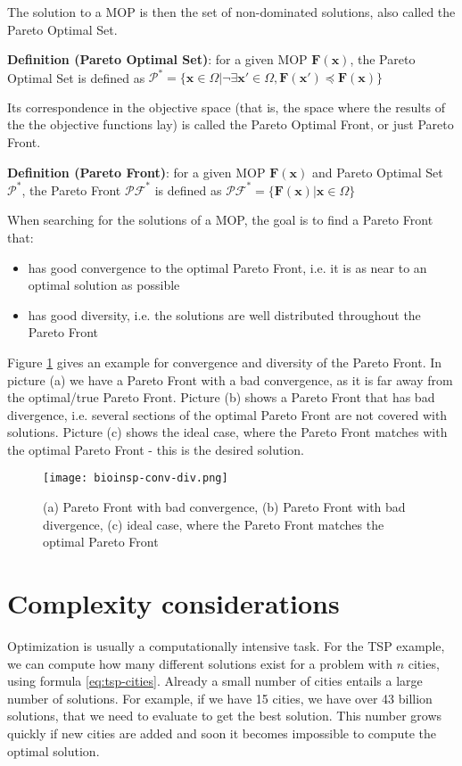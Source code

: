 The solution to a MOP is then the set of non-dominated solutions, also called the Pareto Optimal Set.

\noindent\textbf{Definition (Pareto Optimal Set)}: for a given MOP $\mathbf{F}(\mathbf{x})$, the Pareto Optimal Set is defined as $\mathcal{P}^* = \{\mathbf{x} \in \Omega | \neg \exists \mathbf{x'} \in \Omega, \mathbf{F}(\mathbf{x'}) \preceq \mathbf{F}(\mathbf{x}) \}$

Its correspondence in the objective space (that is, the space where the results of the the objective functions lay) is called the Pareto Optimal Front, or just Pareto Front.

\noindent\textbf{Definition (Pareto Front)}: for a given MOP $\mathbf{F}(\mathbf{x})$ and Pareto Optimal Set $\mathcal{P}^*$, the Pareto Front $\mathcal{PF}^*$ is defined as $\mathcal{PF}^* = \{\mathbf{F}(\mathbf{x}) | \mathbf{x} \in \Omega \}$

When searching for the solutions of a MOP, the goal is to find a Pareto Front that:
\begin{itemize}
  \item has good convergence to the optimal Pareto Front, i.e. it is as near to an optimal solution as possible
  \item has good diversity, i.e. the solutions are well distributed throughout the Pareto Front
\end{itemize}

Figure \ref{fig:conv-div} gives an example for convergence and diversity of the Pareto Front. In picture (a) we have a Pareto Front with a bad convergence, as it is far away from the optimal/true Pareto Front. Picture (b) shows a Pareto Front that has bad divergence, i.e. several sections of the optimal Pareto Front are not covered with solutions. Picture (c) shows the ideal case, where the Pareto Front matches with the optimal Pareto Front - this is the desired solution.

\begin{figure}[ht!]
  \centering
  \texttt{[image: bioinsp-conv-div.png]}
  \caption{(a) Pareto Front with bad convergence, (b) Pareto Front with bad divergence, (c) ideal case, where the Pareto Front matches the optimal Pareto Front}
  \label{fig:conv-div}
\end{figure}

\section{Complexity considerations}
Optimization is usually a computationally intensive task. For the TSP example, we can compute how many different solutions exist for a problem with $n$ cities, using formula \eqref{eq:tsp-cities}. Already a small number of cities entails a large number of solutions. For example, if we have 15 cities, we have over 43 billion solutions, that we need to evaluate to get the best solution. This number grows quickly if new cities are added and soon it becomes impossible to compute the optimal solution.

